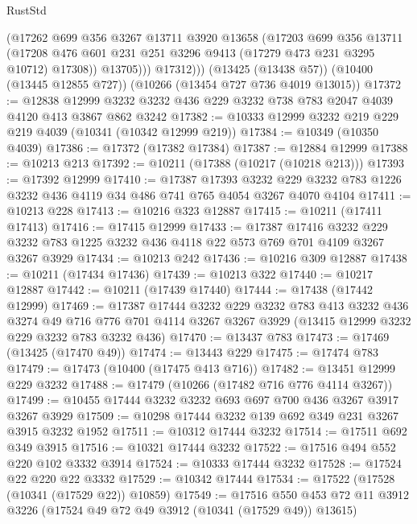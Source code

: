 \begin{lexlean}{RustStd}
\begin{coremodule}
              (@17262
                @699
                @356
                @3267
                @13711
                @3920
                @13658
                (@17203
                  @699
                  @356
                  @13711
                  (@17208 @476 @601 @231 @251 @3296 @9413 (@17279 @473 @231 @3295 @10712) @17308))
                @13705)))
          @17312)))
    (@13425 (@13438 @57))
    (@10400 (@13445 @12855 @727))
    (@10266 (@13454 @727 @736 @4019 @13015))
@17372 := @12838
    @12999
    @3232
    @3232
    @436
    @229
    @3232
    @738
    @783
    @2047
    @4039
    @4120
    @413
    @3867
    @862
    @3242
@17382 := @10333 @12999 @3232 @219 @229 @219 @4039 (@10341 (@10342 @12999 @219))
@17384 := @10349 (@10350 @4039)
@17386 := @17372 (@17382 @17384)
@17387 := @12884 @12999
@17388 := @10213 @213
@17392 := @10211 (@17388 (@10217 (@10218 @213)))
@17393 := @17392 @12999
@17410 := @17387
    @17393
    @3232
    @229
    @3232
    @783
    @1226
    @3232
    @436
    @4119
    @34
    @486
    @741
    @765
    @4054
    @3267
    @4070
    @4104
@17411 := @10213 @228
@17413 := @10216 @323 @12887
@17415 := @10211 (@17411 @17413)
@17416 := @17415 @12999
@17433 := @17387
    @17416
    @3232
    @229
    @3232
    @783
    @1225
    @3232
    @436
    @4118
    @22
    @573
    @769
    @701
    @4109
    @3267
    @3267
    @3929
@17434 := @10213 @242
@17436 := @10216 @309 @12887
@17438 := @10211 (@17434 @17436)
@17439 := @10213 @322
@17440 := @10217 @12887
@17442 := @10211 (@17439 @17440)
@17444 := @17438 (@17442 @12999)
@17469 := @17387
    @17444
    @3232
    @229
    @3232
    @783
    @413
    @3232
    @436
    @3274
    @49
    @716
    @776
    @701
    @4114
    @3267
    @3267
    @3929
    (@13415 @12999 @3232 @229 @3232 @783 @3232 @436)
@17470 := @13437 @783
@17473 := @17469 (@13425 (@17470 @49))
@17474 := @13443 @229
@17475 := @17474 @783
@17479 := @17473 (@10400 (@17475 @413 @716))
@17482 := @13451 @12999 @229 @3232
@17488 := @17479 (@10266 (@17482 @716 @776 @4114 @3267))
@17499 := @10455 @17444 @3232 @3232 @693 @697 @700 @436 @3267 @3917 @3267 @3929
@17509 := @10298 @17444 @3232 @139 @692 @349 @231 @3267 @3915 @3232 @1952
@17511 := @10312 @17444 @3232
@17514 := @17511 @692 @349 @3915
@17516 := @10321 @17444 @3232
@17522 := @17516 @494 @552 @220 @102 @3332 @3914
@17524 := @10333 @17444 @3232
@17528 := @17524 @22 @220 @22 @3332
@17529 := @10342 @17444
@17534 := @17522 (@17528 (@10341 (@17529 @22)) @10859)
@17549 := @17516
    @550
    @453
    @72
    @11
    @3912
    @3226
    (@17524 @49 @72 @49 @3912 (@10341 (@17529 @49)) @13615)

\end{coremodule}
\end{lexlean}
